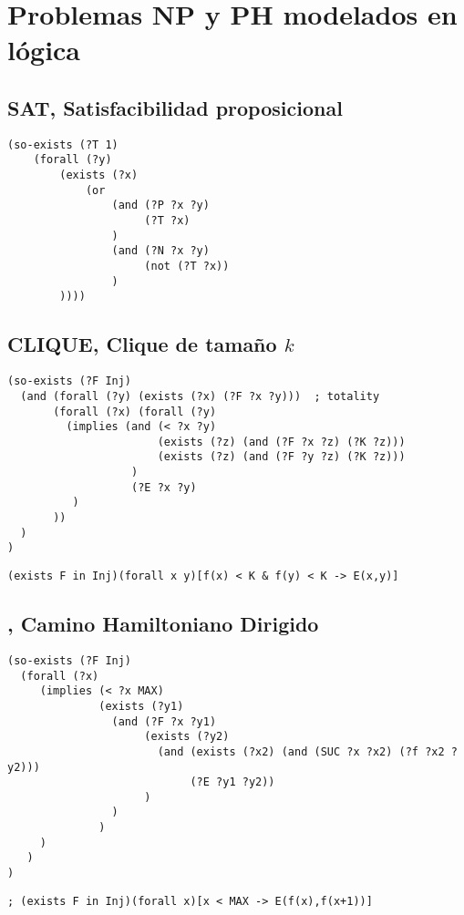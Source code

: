 
\chapter{Problemas NP y PH modelados en lógica}
\label{apendiceA}

\section{SAT, Satisfacibilidad proposicional}
\begin{verbatim}
(so-exists (?T 1)
    (forall (?y)
        (exists (?x)
            (or
                (and (?P ?x ?y)
                     (?T ?x)
                )
                (and (?N ?x ?y)
                     (not (?T ?x))
                )
        ))))
\end{verbatim}

\section{CLIQUE, Clique de tamaño $k$}
\begin{verbatim}
(so-exists (?F Inj)
  (and (forall (?y) (exists (?x) (?F ?x ?y)))  ; totality
       (forall (?x) (forall (?y)
         (implies (and (< ?x ?y)
                       (exists (?z) (and (?F ?x ?z) (?K ?z)))
                       (exists (?z) (and (?F ?y ?z) (?K ?z)))
                   )
                   (?E ?x ?y)
          )
       ))
  )
)
\end{verbatim}

\begin{verbatim}
(exists F in Inj)(forall x y)[f(x) < K & f(y) < K -> E(x,y)]
\end{verbatim}

\section{\CHD, Camino Hamiltoniano Dirigido}
\begin{verbatim}
(so-exists (?F Inj)
  (forall (?x)
     (implies (< ?x MAX)
              (exists (?y1)
                (and (?F ?x ?y1)
                     (exists (?y2)
                       (and (exists (?x2) (and (SUC ?x ?x2) (?f ?x2 ?y2)))
                            (?E ?y1 ?y2))
                     )
                )
              )
     )
   )
)
\end{verbatim}
\begin{verbatim}
; (exists F in Inj)(forall x)[x < MAX -> E(f(x),f(x+1))]
\end{verbatim}

